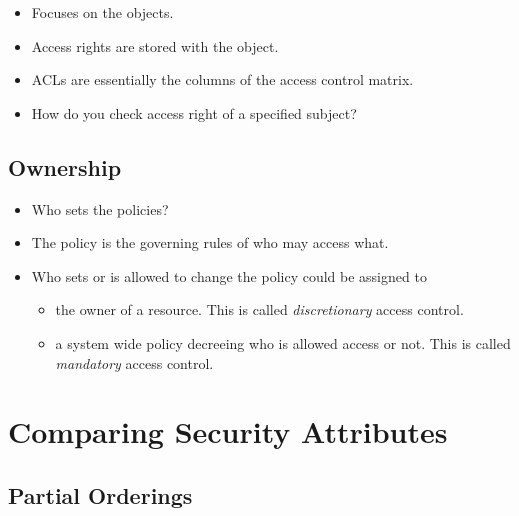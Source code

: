 \begin{frame}
  \begin{itemize}
    \item Focuses on the objects.
    \item Access rights are stored with the object.
    \item ACLs are essentially the columns of the access control matrix.

    \item How do you check access right of a specified subject?
  \end{itemize}
\end{frame}

\subsection{Ownership}

\begin{frame}
  \begin{itemize}
    \item Who sets the policies?

    \item The policy is the governing rules of who may access what.

    \item Who sets or is allowed to change the policy could be assigned to
      \begin{itemize}
        \item the owner of a resource.
          This is called \emph{discretionary} access control.

        \item a system wide policy decreeing who is allowed access or not.
          This is called \emph{mandatory} access control.

      \end{itemize}
  \end{itemize}
\end{frame}


\section{Comparing Security Attributes}

\subsection{Partial Orderings}

